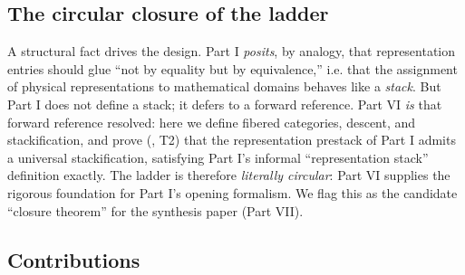 \documentclass[12pt]{article}
\theoremstyle{definition}
\theoremstyle{remark}
\begin{document}
\subsection{The circular closure of the ladder}

A structural fact drives the design. Part I \emph{posits}, by analogy, that
representation entries should glue ``not by equality but by equivalence,'' i.e. that
the assignment of physical representations to mathematical domains behaves like a
\emph{stack}. But Part I does not define a stack; it defers to a forward reference.
Part VI \emph{is} that forward reference resolved: here we define fibered categories,
descent, and stackification, and prove (, T2) that the
representation prestack of Part I admits a universal stackification, satisfying Part
I's informal ``representation stack'' definition exactly. The ladder is therefore
\emph{literally circular}: Part VI supplies the rigorous foundation for Part I's
opening formalism. We flag this as the candidate ``closure theorem'' for the synthesis
paper (Part VII).

\subsection{Contributions}
\end{document}
